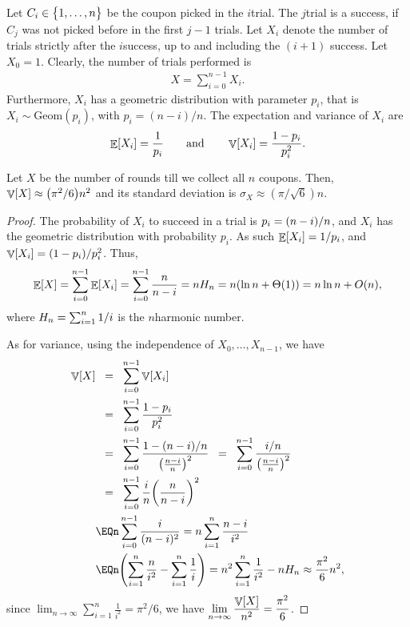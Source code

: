 Let $C_i \in \left\{ {\bigl. 1, \ldots, n} \right\}$ be the coupon picked in the
$i$\th trial. The $j$\th trial is a success, if $C_j$ was not picked
before in the first $j-1$ trials. Let $X_i$ denote the number of trials
strictly after the $i$\th success, up to and including the $(i+1)$\th
success.  Let $X_0=1$.  Clearly, the number of trials performed is
\begin{align*}
    X = \sum_{i=0}^{n-1} X_i.
\end{align*}
Furthermore, $X_i$ has a geometric distribution with parameter $p_i$,
that is $X_i \sim \mathrm{Geom}(p_i)$, with $p_i = (n-i)/n$. The
expectation and variance of $X_i$ are
\begin{equation*}
    \Ex{X_i} = \frac{1}{p_i}
    \qquad\text{and}\qquad%
    \Var{X_i} = \frac{1-p_i}{p_i^2}.
\end{equation*}



\begin{lemma}
    Let $X$ be the number of rounds till we collect all $n$
    coupons. Then, $\Var{ X} \approx \pth{{\pi^2 }/{6}} n^2$ and its
    standard deviation is $\sigma_X \approx ( \pi / \sqrt{6} ) n$.
\end{lemma}
\begin{proof}
    The probability of $X_i$ to succeed in a trial is
    $p_i = {(n-i)}/{n}$, and $X_i$ has the geometric distribution
    with probability $p_i$. As such $\mathop{\mathbb{E}}\!\left[ { X_i} \right] = 1/p_i$, and
    $\mathop{\mathbb{V}}\!\left[ { X_i} \right] = (1-p_i)/p_i^2$.  Thus,
    \begin{equation*}
        \Ex{ X}%
        =%
        \sum_{i=0}^{n-1} \Ex{  X_i}%
        =%
        \sum_{i=0}^{n-1} \frac{n}{n-i}%
        =%
        n H_n%
        =%
        n( \ln {n} + \Theta(1))%
        =%
        n \ln n + O(n),
    \end{equation*}
    where $H_n = \sum_{i=1}^{n} {1}/{i}$ is the $n$\th harmonic
    number.

 
    As for variance, using the independence of $X_0,\ldots, X_{n-1}$,
    we have
    \begin{align*}
      \Var{ X}%
      &\EQ%
        \sum_{i=0}^{n-1} \Var{ X_i}%
        \\&
        \EQ%
        \sum_{i=0}^{n-1} \frac{1-p_i}{p_i^2}%
        \\&
        \EQ%
        \sum_{i=0}^{n-1} \frac{1-(n-i)/n}{\pth{\frac{n-i}{n}}^2}%
        \EQ%
        \sum_{i=0}^{n-1} \frac{i/n}{\pth[]{\frac{n-i}{n}}^2}%
        \\&
        \EQ
        \sum_{i=0}^{n-1} \frac{i}{n} \pth{\frac{n}{n-i}}^2%
      \\&%
      \EQ%
      n \sum_{i=0}^{n-1} \frac{i}{(n-i)^2}%
      =%
      n \sum_{i=1}^{n} \frac{n-i}{i^2}%
      \\&
      \EQ%
      n \pth[]{ \sum_{i=1}^{n} \frac{n}{i^2} - \sum_{i=1}^{n}
      \frac{1}{i}}%
      =%
      n^2 \sum_{i=1}^{n} \frac{1}{i^2} - n H_n
      \approx %
      \frac{\pi^2}{6}n^2,
    \end{align*}
    since
    $\lim_{n\rightarrow \infty} \sum_{i=1}^{n} \frac{1}{i^2} =
    \pi^2/6$, we have
    $\displaystyle \lim_{n\rightarrow \infty} \frac{\mathop{\mathbb{V}}\!\left[ {X} \right]}{n^2} =
    \frac{\pi^2}{6}$.
\end{proof}

